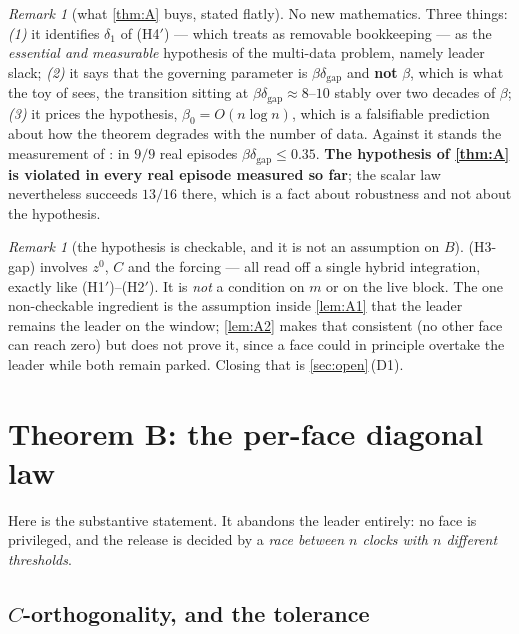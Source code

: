 \documentclass[11pt]{article}
\theoremstyle{remark}
\newtheorem{remark}[theorem]{Remark}
\newcommand{\dgap}{\delta_{\mathrm{gap}}}
\newcommand{\hyplabel}[1]{\textup{(#1)}}
\begin{document}
\begin{remark}[what \cref{thm:A} buys, stated flatly]\label{rem:whatAbuys}
No new mathematics. Three things:
\emph{(1)} it identifies $\delta_1$ of \hyplabel{H4$'$} --- which
\cite[Rem.~hyp]{paper} treats as removable bookkeeping --- as the
\emph{essential and measurable} hypothesis of the multi-data problem, namely
leader slack;
\emph{(2)} it says that the governing parameter is $\beta\dgap$ and \textbf{not}
$\beta$, which is what the toy of \cite[\S4.1]{scoping} sees, the transition
sitting at $\beta\dgap\approx8$--$10$ stably over two decades of $\beta$;
\emph{(3)} it prices the hypothesis, $\beta_0=O(n\log n)$, which is a falsifiable
prediction about how the theorem degrades with the number of data. Against it
stands the measurement of \cite[\S3]{scoping}: in $9/9$ real episodes
$\beta\dgap\le0.35$. \textbf{The hypothesis of \cref{thm:A} is violated in every
real episode measured so far}; the scalar law nevertheless succeeds $13/16$
there, which is a fact about robustness and not about the hypothesis.
\end{remark}

\begin{remark}[the hypothesis is checkable, and it is not an assumption on $B$]
\hyplabel{H3-gap} involves $z^0$, $C$ and the forcing --- all read off a single
hybrid integration, exactly like \hyplabel{H1$'$}--\hyplabel{H2$'$}. It is
\emph{not} a condition on $m$ or on the live block. The one non-checkable
ingredient is the assumption inside \cref{lem:A1} that the leader remains the
leader on the window; \cref{lem:A2} makes that consistent (no other face can
reach zero) but does not prove it, since a face could in principle overtake the
leader while both remain parked. Closing that is
\cref{sec:open}\,(D1).
\end{remark}

\section{Theorem B: the per-face diagonal law}\label{sec:B}

Here is the substantive statement. It abandons the leader entirely: no face is
privileged, and the release is decided by a \emph{race between $n$ clocks with
$n$ different thresholds}.

\subsection{$C$-orthogonality, and the tolerance}
\end{document}
